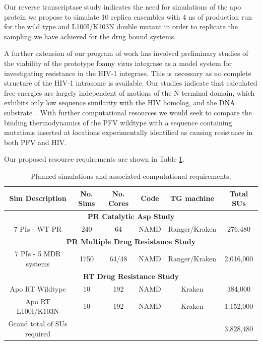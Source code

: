 \documentclass[a4paper,10pt]{article}
\begin{document}
Our reverse transcriptase study indicates the need for simulations of the apo protein we propose to simulate 
10 replica ensembles with 4 ns of production run for the wild type and L100I/K103N double mutant in order to 
replicate the sampling we have achieved for the drug bound systems. 

A further extension of our program of work has involved preliminary studies of the viability of the prototype foamy virus integrase as a model system for investigating resistance in the HIV-1 integrase. This is necessary as no complete structure of the HIV-1 intrasome is available. Our studies indicate that calculated free energies are largely independent of motions of the N terminal domain, which exhibits only low sequence similarity with the HIV homolog, and the DNA substrate~\cite{Ref5}. With further computational resources we would seek to compare the binding thermodynamics of the PFV wildtype with a sequence containing mutations inserted at locations experimentally identified as causing resistance in both PFV and HIV.

Our proposed resource requirements are shown in Table \ref{t:hiv_req}.

\begin{table}[h]
\centering
\begin{tabular}[b]
{|c|c|c|c|c|c|}
\hline
\textbf{Sim Description} & \textbf{No. Sims} &
\textbf{No. Cores} & \textbf{Code} & \textbf{TG machine} & \textbf{Total SUs}\\
\hline
\multicolumn{6}{|c|}{\textbf{PR Catalytic Asp Study}}\\
\hline
7 PIs - WT PR & 240 & 64 & NAMD & Ranger/Kraken & 276,480 \\
\hline
\multicolumn{6}{|c|}{\textbf{PR Multiple Drug Resistance Study}}\\
\hline
7 PIs - 5 MDR systems & 1750 & 64/48 & NAMD & Ranger/Kraken & 2,016,000 \\
\hline
\multicolumn{6}{|c|}{\textbf{RT Drug Resistance Study}}\\
\hline
Apo RT Wildtype & 10 & 192 & NAMD & Kraken & 384,000\\
\hline
Apo RT L100I/K103N & 10 & 192 & NAMD & Kraken & 1,152,000\\
\hline
Grand total of SUs required & & & & & 3,828,480\\
\hline
\end{tabular} \caption{Planned simulations and associated computational requirements.}
\label{t:hiv_req}
\end{table}
\end{document}
